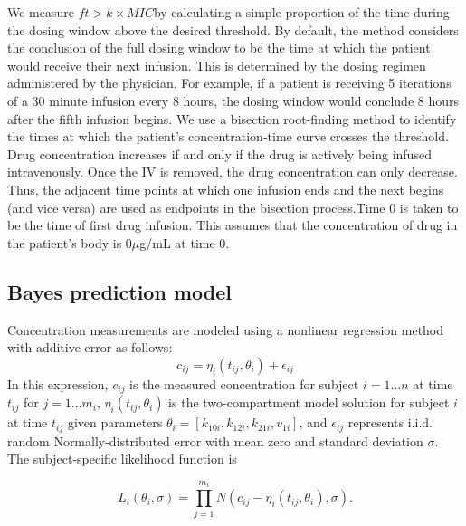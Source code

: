 \documentclass{article}\usepackage[]{graphicx}\usepackage[]{color}
\newcommand{\mic}{$ft > k \times MIC$}
\begin{document}
We measure \mic by calculating a simple proportion of the time during the dosing window above the desired threshold. By default, the method considers the conclusion of the full dosing window to be the time at which the patient would receive their next infusion. This is determined by the dosing regimen administered by the physician. For example, if a patient is receiving 5 iterations of a 30 minute infusion every 8 hours, the dosing window would conclude 8 hours after the fifth infusion begins. We use a bisection root-finding method to identify the times at which the patient's concentration-time curve crosses the threshold. Drug concentration increases if and only if the drug is actively being infused intravenously. Once the IV is removed, the drug concentration can only decrease. Thus, the adjacent time points at which one infusion ends and the next begins (and vice versa) are used as endpoints in the bisection process.Time 0 is taken to be the time of first drug infusion. This assumes that the concentration of drug in the patient's body is 0$\mu$g/mL at time 0.



\subsection{Bayes prediction model} %
Concentration measurements are modeled using a nonlinear regression method with additive error as follows:
\begin{displaymath}
c_{ij} = \eta_i(t_{ij}, \theta_i) + \epsilon_{ij}
\end{displaymath}
\noindent In this expression, $c_{ij}$ is the measured concentration for subject $i = 1 \ldots n$ at time $t_{ij}$ for $j = 1 \ldots m_i$, $\eta_i(t_{ij}, \theta_i)$ is the two-compartment model solution for subject $i$ at time $t_{ij}$ given parameters $\theta_i = [k_{10i}, k_{12i}, k_{21i}, v_{1i}]$, and $\epsilon_{ij}$ represents i.i.d. random Normally-distributed error with mean zero and standard deviation $\sigma$. The subject-specific likelihood function is

\begin{displaymath}
L_i(\theta_i, \sigma) = \prod_{j=1}^{m_i} N(c_{ij} - \eta_i(t_{ij}, \theta_i), \sigma).
\end{displaymath}
\end{document}

